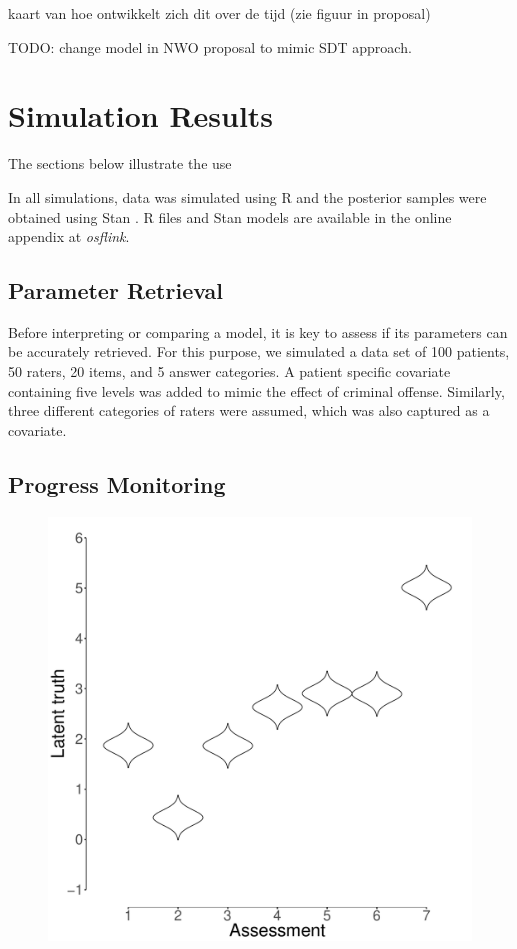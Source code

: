 \documentclass{article}
\newcommand{\osflink}{\textit{osflink}}
\begin{document}
kaart van hoe ontwikkelt zich dit over de tijd (zie figuur in proposal)

TODO: change model in NWO proposal to mimic SDT approach.

\section*{Simulation Results}

The sections below illustrate the use  

In all simulations, data was simulated using R \cite{R} and the posterior samples were obtained using Stan \cite{CarpenterEtAl2017Stan}. R files and Stan models are available in the online appendix at \osflink{}.

\subsection*{Parameter Retrieval}
Before interpreting or comparing a model, it is key to assess if its parameters can be accurately retrieved. For this purpose, we simulated a data set of 100 patients, 50 raters, 20 items, and 5 answer categories. A patient specific covariate containing five levels was added to mimic the effect of criminal offense. Similarly, three different categories of raters were assumed, which was also captured as a covariate.

\subsection*{Progress Monitoring}

\begin{figure}[!ht]
	\includegraphics[width=\linewidth]{figures/progressMonitoring.pdf}
\end{figure}
\end{document}
